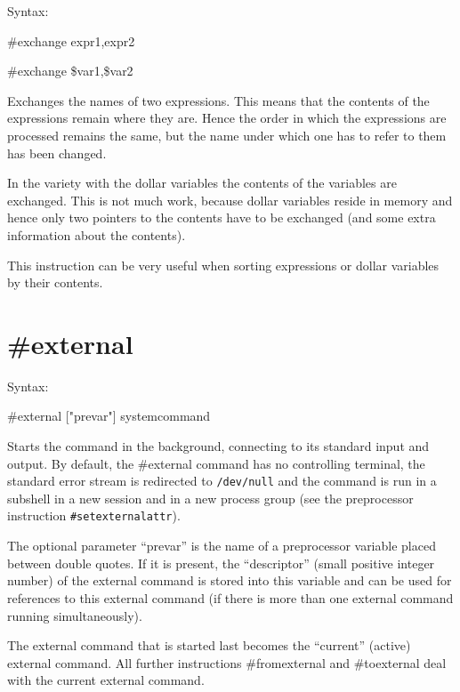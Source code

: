\noindent Syntax:

\#exchange expr1,expr2

\#exchange \$var1,\$var2

\noindent Exchanges the names of two 
expressions. This means that the contents of the 
expressions remain where they are. Hence the order in which the expressions 
are processed remains the same, but the name under which one has to refer 
to them has been changed.

In the variety with the dollar variables the contents of 
the variables are exchanged. This is not much work, because dollar 
variables reside in memory and hence only two pointers to the contents have 
to be exchanged (and some extra information about the contents).

This instruction can be very useful when sorting expressions or dollar 
variables by their contents.


\section{\#external}
\label{preexternal}

\noindent Syntax:

\#external ["prevar"] systemcommand

\noindent Starts the command in the background, 
connecting to its standard 
input and output. By default, 
the \#external command has no controlling terminal, the standard error stream 
is redirected to \verb|/dev/null| and the command is run in a subshell in a 
new session and in a new process group (see the preprocessor instruction 
\verb|#setexternalattr|).

The optional parameter ``prevar'' is the name of a preprocessor variable 
placed between double quotes. If it is present, the ``descriptor'' (small 
positive integer number) of the external command is stored into this 
variable and can be used for references to this external command (if there 
is more than one external command running simultaneously).

The external command that is started last becomes the ``current'' (active) 
external command.  All further instructions 
\#fromexternal and \#toexternal 
deal with the current external command.

